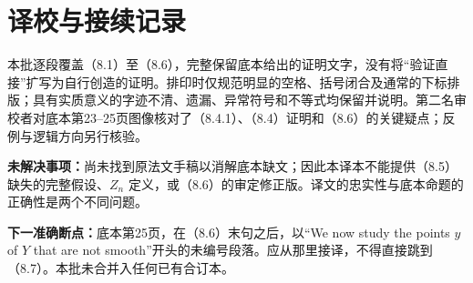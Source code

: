 \documentclass{ctexbook}
\begin{document}
\chapter*{译校与接续记录}
本批逐段覆盖（8.1）至（8.6），完整保留底本给出的证明文字，没有将“验证直接”扩写为自行创造的证明。排印时仅规范明显的空格、括号闭合及通常的下标排版；具有实质意义的字迹不清、遗漏、异常符号和不等式均保留并说明。第二名审校者对底本第23--25页图像核对了（8.4.1）、（8.4）证明和（8.6）的关键疑点；反例与逻辑方向另行核验。

\textbf{未解决事项：}尚未找到原法文手稿以消解底本缺文；因此本译本不能提供（8.5）缺失的完整假设、$Z_n$ 定义，或（8.6）的审定修正版。译文的忠实性与底本命题的正确性是两个不同问题。

\textbf{下一准确断点：}底本第25页，在（8.6）末句之后，以“We now study the points $y$ of $Y$ that are not smooth”开头的未编号段落。应从那里接译，不得直接跳到（8.7）。本批未合并入任何已有合订本。
\end{document}

